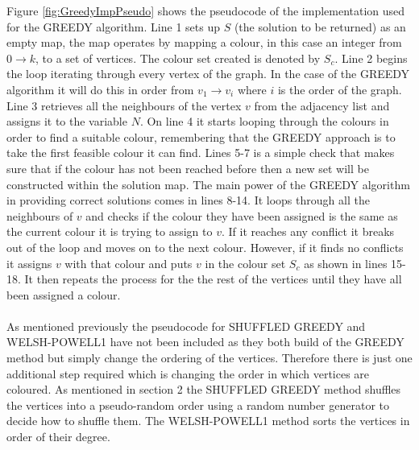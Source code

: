 Figure \ref{fig:GreedyImpPseudo} shows the pseudocode of the implementation used for the GREEDY algorithm. Line 1 sets up $S$ (the solution to be returned) as an empty map, the map operates by mapping a colour, in this case an integer from $0 \rightarrow k$, to a set of vertices. The colour set created is denoted by $S_{c}$. Line 2 begins the loop iterating through every vertex of the graph. In the case of the GREEDY algorithm it will do this in order from $v_{1} \rightarrow v_{i}$ where $i$ is the order of the graph. Line 3 retrieves all the neighbours of the vertex $v$ from the adjacency list and assigns it to the variable $N$. On line 4 it starts looping through the colours in order to find a suitable colour, remembering that the GREEDY approach is to take the first feasible colour it can find. Lines 5-7 is a simple check that makes sure that if the colour has not been reached before then a new set will be constructed within the solution map. The main power of the GREEDY algorithm in providing correct solutions comes in lines 8-14. It loops through all the neighbours of $v$ and checks if the colour they have been assigned is the same as the current colour it is trying to assign to $v$. If it reaches any conflict it breaks out of the loop and moves on to the next colour. However, if it finds no conflicts it assigns $v$ with that colour and puts $v$ in the colour set $S_{c}$ as shown in lines 15-18. It then repeats the process for the the rest of the vertices until they have all been assigned a colour. 
\\\\
As mentioned previously the pseudocode for SHUFFLED GREEDY and WELSH-POWELL1 have not been included as they both build of the GREEDY method but simply change the ordering of the vertices. Therefore there is just one additional step required which is changing the order in which vertices are coloured. As mentioned in section 2 the SHUFFLED GREEDY method shuffles the vertices into a pseudo-random order using a random number generator to decide how to shuffle them. The WELSH-POWELL1 method sorts the vertices in order of their degree.

